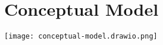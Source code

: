 \section{Conceptual Model}

\begin{center}
    \texttt{[image: conceptual-model.drawio.png]}
\end{center}